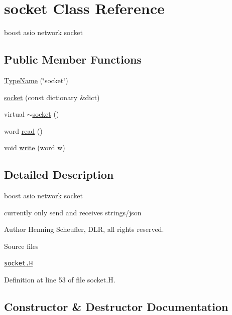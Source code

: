 \hypertarget{classFoam_1_1socket}{}\section{socket Class Reference}
\label{classFoam_1_1socket}


boost asio network socket  


\subsection*{Public Member Functions}
\begin{DoxyCompactItemize}
\item 
\hyperlink{classFoam_1_1socket_a6a8cf74836209cfff437109ceeffd442}{Type\+Name} (\char`\"{}socket\char`\"{})
\item 
\hyperlink{classFoam_1_1socket_a5880c72bbd42b68dde7737feb7c3e347}{socket} (const dictionary \&dict)
\item 
virtual \hyperlink{classFoam_1_1socket_a3cb65ce2c1bff89efe4e755d3587848e}{$\sim$socket} ()
\item 
word \hyperlink{classFoam_1_1socket_aaef38f7ec08b1ae0135900e9ae1fb1f8}{read} ()
\item 
void \hyperlink{classFoam_1_1socket_a5abf104fabb38aa7c80721483091cf0b}{write} (word w)
\end{DoxyCompactItemize}


\subsection{Detailed Description}
boost asio network socket 

\label{_Description}%
 currently only send and receives strings/json

Author Henning Scheufler, D\+LR, all rights reserved.

\begin{DoxyParagraph}{Source files}

\begin{DoxyItemize}
\item \href{../../../home/carlo/data/GeN-Foam/GeN-Foam_ffn/GeN-Foam/GeN-Foam/FMU4FOAM/ECI4FOAM/src/externalComm/networkInterface/socket.H}{\tt socket.\+H} 
\end{DoxyItemize}
\end{DoxyParagraph}


Definition at line 53 of file socket.\+H.



\subsection{Constructor \& Destructor Documentation}
\mbox{\label{classFoam_1_1socket_a5880c72bbd42b68dde7737feb7c3e347}} 
